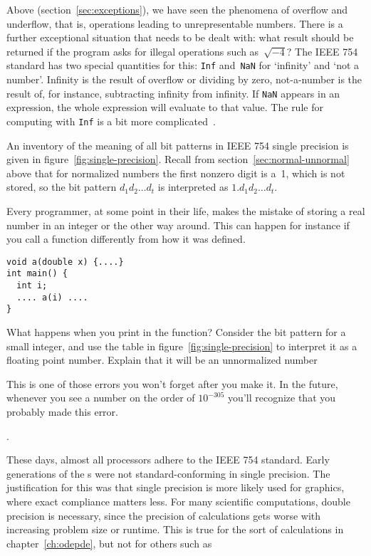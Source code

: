 Above (section~\ref{sec:exceptions}), we have seen the phenomena of
overflow and underflow, that is, operations leading to unrepresentable
numbers. There is a further exceptional situation that needs to be
dealt with: what result should be returned if the program asks for
illegal operations such as~$\sqrt{-4}$? The IEEE 754 standard has two
special quantities for this: \texttt{Inf} and~\texttt{NaN} for
`infinity' and `not a number'.  Infinity is the result of overflow or
dividing by zero, not-a-number is the result of, for instance,
subtracting infinity from infinity.  If \texttt{NaN} appears in an
expression, the whole expression will evaluate to that value. The rule
for computing with \texttt{Inf} is a bit more
complicated~\cite{goldberg:floatingpoint}.

An inventory of the meaning of all bit patterns in IEEE
754 single precision is given in figure~\ref{fig:single-precision}.
Recall from section~\ref{sec:normal-unnormal} above
that for normalized numbers the first nonzero digit is a~1, which
is not stored, so the bit pattern $d_1d_2\ldots d_t$ is interpreted as
$1.d_1d_2\ldots d_t$.

\begin{exercise}
  Every programmer, at some point in their life, makes the mistake of
  storing a real number in an integer or the other way around. This
  can happen for instance if you call a function differently from how
  it was defined.
\begin{verbatim}
void a(double x) {....}
int main() {
  int i;
  .... a(i) ....
}
\end{verbatim}
What happens when you print  in the function? Consider the bit
pattern for a small integer, and use the table in
figure~\ref{fig:single-precision} to interpret it as a floating point
number. Explain that it will be an unnormalized number
\begin{footnoteenv}
  {This
  is one of those errors you won't forget after you make it. In the
  future, whenever you see a number on the order of $10^{-305}$ you'll
  recognize that you probably made this error.}
\end{footnoteenv}
.
\end{exercise}

These days, almost all processors adhere to the IEEE 754 standard.
Early generations of the 
s were not standard-conforming in single precision.
The justification
for this was that single precision is more likely used for graphics,
where exact compliance matters less. For many scientific computations,
double precision is necessary, since the precision of calculations
gets worse with increasing problem size or runtime. This is true for
the sort of calculations in chapter~\ref{ch:odepde}, but not for
others such as 


